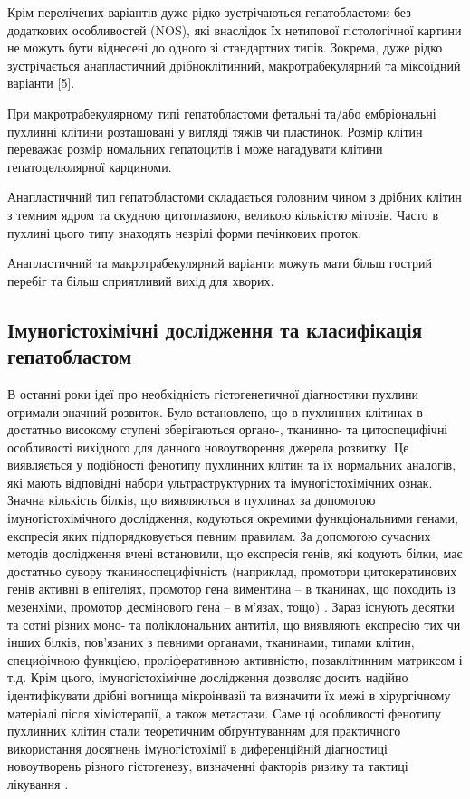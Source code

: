 Крім перелічених варіантів дуже рідко зустрічаються гепатобластоми без додаткових особливостей (NOS), які внаслідок їх нетипової гістологічної картини не можуть бути віднесені до одного зі стандартних типів. Зокрема, дуже рідко зустрічається анапластичний дрібноклітинний, макротрабекулярний та міксоїдний варіанти [5]. 

При макротрабекулярному типі гепатобластоми   фетальні та/або ембріональні пухлинні клітини розташовані у вигляді тяжів чи пластинок. Розмір клітин переважає розмір номальних гепатоцитів і може нагадувати клітини гепатоцелюлярної карциноми.

Анапластичний тип гепатобластоми складається головним чином з дрібних клітин з темним ядром та скудною цитоплазмою, великою кількістю мітозів. Часто в пухлині цього типу знаходять незрілі форми печінкових проток.

Анапластичний та макротрабекулярний варіанти можуть мати більш гострий перебіг та більш сприятливий вихід для хворих.

\subsection{Імуногістохімічні дослідження та класифікація гепатобластом}

В останні роки  ідеї про необхідність гістогенетичної діагностики пухлини отримали значний розвиток. Було встановлено, що в пухлинних клітинах в достатньо високому ступені зберігаються органо-,  тканинно- та цитоспецифічні особливості вихідного для данного новоутворення джерела розвитку. Це виявляється у подібності фенотипу пухлинних клітин та їх нормальних аналогів, які мають відповідні набори ультраструктурних та імуногістохімічних ознак. Значна кількість білків, що виявляються в пухлинах за допомогою імуногістохімічного дослідження, кодуються окремими функціональними генами, експресія яких підпорядковується певним правилам. За допомогою сучасних методів дослідження вчені встановили, що експресія генів, які кодують білки, має достатньо  сувору тканиноспецифічність (наприклад, промотори цитокератинових генів активні в епітеліях, промотор гена виментина – в тканинах, що походить із мезенхіми, промотор десмінового гена – в м’язах, тощо) \cite{pmid22648963}. 
Зараз існують десятки та сотні різних моно- та поліклональних антитіл, що виявляють експресію тих чи інших білків, пов’язаних з певними органами, тканинами, типами клітин, специфічною функцією, проліферативною активністю, позаклітинним матриксом і т.д. Крім цього, імуногістохімічне дослідження  дозволяє досить надійно ідентифікувати дрібні вогнища мікроінвазії та визначити їх межі в хірургічному матеріалі після хіміотерапії, а також  метастази. Саме ці особливості фенотипу пухлинних клітин стали теоретичним обґрунтуванням для практичного використання досягнень імуногістохімії в диференційній діагностиці новоутворень різного гістогенезу, визначенні факторів ризику та тактиці лікування \cite{pmid27781375}. 


